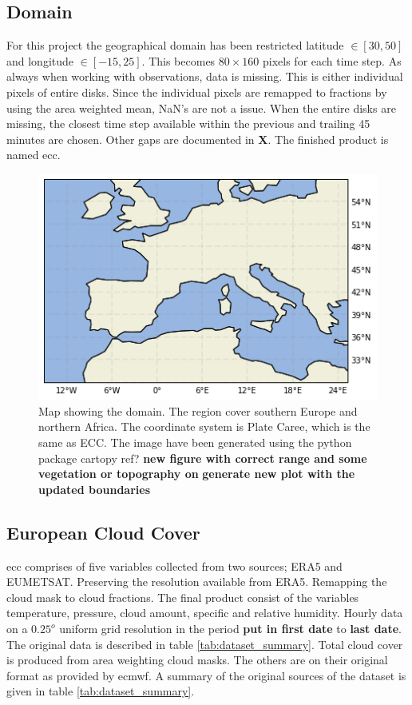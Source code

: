 \subsection{Domain}
For this project the geographical domain has been restricted latitude $\in[30,50]$ and longitude $\in [-15, 25]$. This becomes $80\times160$ pixels for each time step. As always when working with observations, data is missing. This is either individual pixels of entire disks. Since the individual pixels are remapped to fractions by using the area weighted mean, NaN's are not a issue. When the entire disks are missing, the closest time step available within the previous and trailing 45 minutes are chosen. Other gaps are documented in \textbf{X}. The finished product is named \acrfull{ecc}.
\begin{figure}[h]
    \centering
    \includegraphics[scale = 0.7]{Chapter2_Theory/images/Domain.png}
    \caption{Map showing the domain. The region cover southern Europe and northern Africa. The coordinate system is Plate Caree, which is the same as ECC. The image have been generated using the python package cartopy ref? \textbf{new figure with correct range and some vegetation or topography on  } \textbf{generate new plot with the updated boundaries}}
    \label{fig:map}
\end{figure}

\subsection{European Cloud Cover} \label{sec:ecc}
\acrfull{ecc} comprises of five variables collected from two sources; ERA5 and EUMETSAT. Preserving the resolution available from ERA5. Remapping the cloud mask to cloud fractions. The final product consist of the variables temperature, pressure, cloud amount, specific and relative humidity. Hourly data on a $0.25^o$ uniform grid  resolution in the period \textbf{put in first date} to \textbf{last date}. The original data is described in table \ref{tab:dataset_summary}. Total cloud cover is produced from area weighting cloud masks. The others are on their original format as provided by \acrfull{ecmwf}. A summary of the original sources of the dataset is given in table \ref{tab:dataset_summary}.

